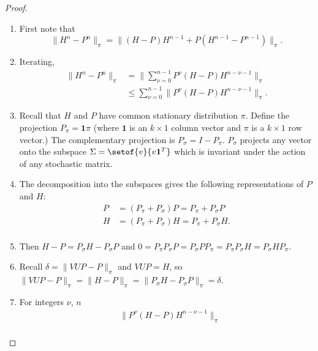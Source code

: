 \documentclass[12pt]{article}
\begin{document}
\begin{proof}
    \begin{enumerate}
        \item
            First note that
            \[
                \| H^n - P^n \|_{\pi} = \|(H-P)H^{n-1}+P(H^{n-1} -P^{n-1})\|_
                {\pi}.
            \]
        \item
            Iterating,
            \begin{align*}
                \| H^n - P^n \|_{\pi} &= \| \sum_{\nu=0}^{n-1} P^\nu(H-P)H^
                {n-\nu-1}\|_{\pi} \\
                & \le \sum_{\nu=0}^{n-1} \| P^\nu(H-P)H^{n-\nu-1}\|_{\pi}.
            \end{align*}
        \item
            Recall that \( H \) and \( P \) have common stationary
            distribution \( \pi \).  Define the projection \( P_{\pi} =
            \mathbf{1} \pi \) (where \( \mathbf{1} \) is an \( k \times
            1 \) column vector and \( \pi \) is a \( k \times 1 \) row
            vector.) The complementary projection is \( P_{\sigma} = I -
            P_{\pi} \).  \( P_{\sigma} \) projects any vector onto the
            subspace \( \Sigma = \setof{v}{v \mathbf{1}^T} \) which is
            invariant under the action of any stochastic matrix.
        \item
            The decomposition into the subspaces gives the following
            representations of \( P \) and \( H \):
            \begin{align*}
                P &= (P_{\pi} + P_{\sigma}) P = P_{\pi} + P_{\sigma}P \\
                H &= (P_{\pi} + P_{\sigma}) H = P_{\pi} + P_{\sigma}H.
                \\
            \end{align*}
        \item
            Then \( H - P = P_{\sigma}H - P_{\sigma}P \) and \( 0 = P_{\pi}
            P_{\sigma} P = P_{\sigma} P P_{\pi} = P_{\pi} P_{\sigma} H =
            P_{\sigma} H P_{\pi} \).
        \item
            Recall \( \delta = \| VUP - P \|_{\pi} \) and \( VUP = H \),
            so \( \| VUP - P \|_{\pi} = \| H - P \|_{\pi} = \|P_{\sigma}H
            - P_{\sigma}P\|_{\pi} = \delta \).
        \item
            For integers \( \nu \), \( n \)
            \begin{align*}
                & \| P^\nu(H-P)H^{n-\nu-1} \|_{\pi} \\

\end{align*}
\end{enumerate}
\end{proof}
\end{document}
